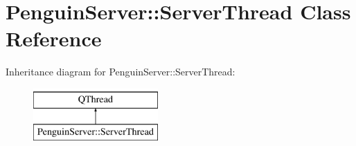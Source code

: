 \hypertarget{classPenguinServer_1_1ServerThread}{\section{Penguin\-Server\-:\-:Server\-Thread Class Reference}
\label{classPenguinServer_1_1ServerThread}
}
Inheritance diagram for Penguin\-Server\-:\-:Server\-Thread\-:\begin{figure}[H]
\begin{center}
\leavevmode
\includegraphics[height=2.000000cm]{classPenguinServer_1_1ServerThread}
\end{center}
\end{figure}
